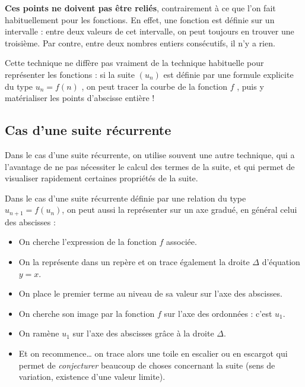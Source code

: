 \documentclass[a4paper,11pt]{article}
\begin{document}
\begin{cattention}
\textbf{Ces points ne doivent pas être reliés}, contrairement à ce que l'on fait habituellement pour les fonctions. En effet, une fonction est définie sur un intervalle : entre deux valeurs de cet intervalle, on peut toujours en trouver une troisième. Par contre, entre deux nombres entiers consécutifs, il n'y a rien.
\end{cattention}

\begin{crmq}
Cette technique ne diffère pas vraiment de la technique habituelle pour représenter les fonctions : si la suite $(u_n)$ est définie par une formule explicite du type $u_n=f(n)$ , on peut tracer la courbe de la fonction $f$ , puis y matérialiser les points d’abscisse entière !
\end{crmq}

\subsection{Cas d'une suite récurrente}

\begin{cidee}
Dans le cas d'une suite récurrente, on utilise souvent une autre technique, qui a l'avantage de ne pas nécessiter le calcul des termes de la suite, et qui permet de visualiser rapidement certaines propriétés de la suite.
\end{cidee}

\begin{cmethode}
Dans le cas d'une suite récurrente définie par une relation du type $u_{n+1}=f(u_n)$, on peut aussi la représenter sur un axe gradué, en général celui des abscisses :
\begin{itemize}[leftmargin=*]
	\item On cherche l'expression de la fonction $f$ associée.
	\item On la représente dans un repère et on trace également la droite $\Delta$ d'équation $y=x$.
	\item On place le premier terme au niveau de sa valeur sur l'axe des abscisses.
	\item On cherche son image par la fonction $f$ sur l'axe des ordonnées : c'est $u_1$.
	\item On ramène $u_1$ sur l'axe des abscisses grâce à la droite $\Delta$.
	\item Et on recommence\ldots{} on trace alors une \og toile \fg{} en \og escalier \fg{} ou en \og escargot \fg{} qui permet de \textit{conjecturer} beaucoup de choses concernant la suite (sens de variation, existence d'une valeur limite).
\end{itemize}
\end{cmethode}
\end{document}
